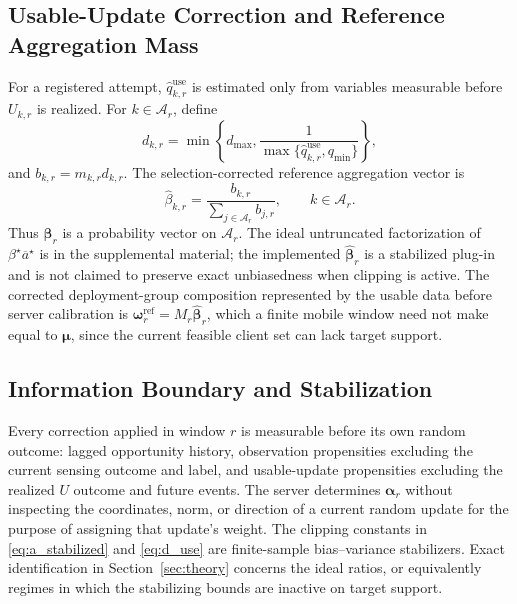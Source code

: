 \documentclass[letterpaper,journal]{IEEEtran}
\begin{document}
\subsection{Usable-Update Correction and Reference Aggregation Mass}
\label{subsec:usable_correction}

For a registered attempt, $\widehat q^{\mathrm{use}}_{k,r}$ is estimated only
from variables measurable before $U_{k,r}$ is realized.  For
$k\in\mathcal{A}_r$, define
\begin{equation}
 d_{k,r}
 =
 \min\!\left\{
 d_{\max},
 \frac{1}
 {\max\{\widehat q^{\mathrm{use}}_{k,r},q_{\min}\}}
 \right\},
 \label{eq:d_use}
\end{equation}
and $b_{k,r}=m_{k,r}d_{k,r}$.
The selection-corrected reference aggregation vector is
\begin{equation}
 \widehat\beta_{k,r}
 =
 \frac{b_{k,r}}
 {\sum_{j\in\mathcal{A}_r}b_{j,r}},
 \qquad
 k\in\mathcal{A}_r.
 \label{eq:beta_ref}
\end{equation}
Thus $\widehat{\boldsymbol\beta}_r$ is a probability vector on
$\mathcal{A}_r$.  The ideal untruncated factorization of
$\beta^\star\overline a^\star$ is in the supplemental material; the implemented
$\widehat{\boldsymbol\beta}_r$ is a stabilized plug-in and is not claimed to
preserve exact unbiasedness when clipping is active.  The corrected
deployment-group composition represented by the usable data before server
calibration is $\boldsymbol\omega_r^{\mathrm{ref}}=M_r\widehat{\boldsymbol\beta}_r$,
which a finite mobile window need not make equal to $\boldsymbol\mu$, since the
current feasible client set can lack target support.

\subsection{Information Boundary and Stabilization}
\label{subsec:information_boundary}

Every correction applied in window $r$ is measurable before its own random
outcome: lagged opportunity history, observation propensities excluding the
current sensing outcome and label, and usable-update propensities excluding the
realized $U$ outcome and future events.  The server determines $\boldsymbol\alpha_r$ without
inspecting the coordinates, norm, or direction of a current random
update for the purpose of assigning that update's weight.  The clipping
constants in \eqref{eq:a_stabilized} and \eqref{eq:d_use} are
finite-sample bias--variance stabilizers.  Exact identification in
Section~\ref{sec:theory} concerns the ideal ratios, or equivalently
regimes in which the stabilizing bounds are inactive on target support.
\end{document}
